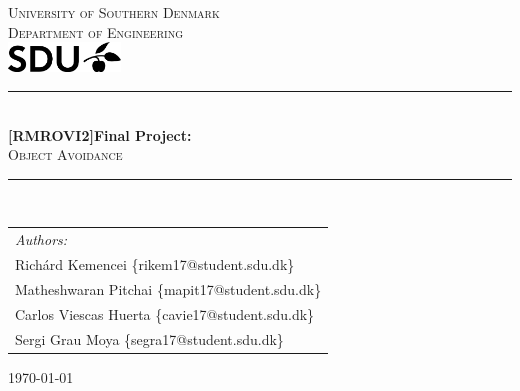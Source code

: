 
\thispagestyle{empty}

\begin{minipage}{0.95\textwidth}

\newcommand{\HRule}{\rule{\linewidth}{0.5mm}}

\center 

\textsc{\large University of Southern Denmark  \\[0.4cm] Department of Engineering }\\[0.5cm] 
\includegraphics[width=3cm]{Images/SDU_logo.png}

\HRule \\[0.4cm]

{ \LARGE \bfseries [RMROVI2]Final Project:}\\[0.4cm]
\large \textsc{Object Avoidance }

\HRule \\[1.5cm]
 

\begin{center}
\small
\begin{tabular}{l}
\textit{Authors:} \\

Richárd Kemencei  \{rikem17@student.sdu.dk\} \\
Matheshwaran Pitchai \{mapit17@student.sdu.dk\} \\
Carlos Viescas Huerta \{cavie17@student.sdu.dk\} \\
Sergi Grau Moya \{segra17@student.sdu.dk\} \\

\end{tabular}
\end{center}

\vspace{5cm}


{\large \today}\\[1cm] 


\end{minipage}

